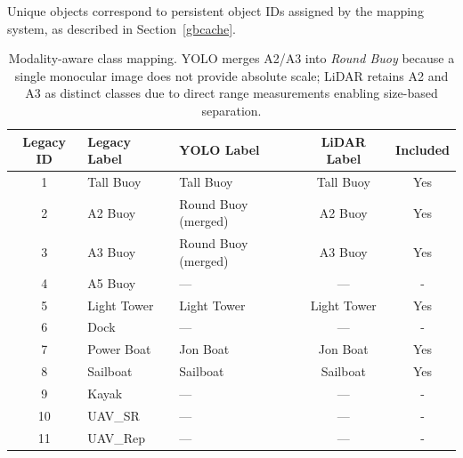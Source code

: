 \documentclass[../main.tex]{subfiles}
\begin{document}


Unique objects correspond to persistent object IDs assigned by the mapping system, as described in Section~\ref{gbcache}.

\begin{table}[ht]
\centering
\begin{tabular}{cllcc}
\hline
Legacy ID & Legacy Label & YOLO Label & LiDAR Label  & Included \\
\hline
1  & Tall Buoy          & Tall Buoy              & Tall Buoy          & Yes \\
2  & A2 Buoy            & Round Buoy (merged)    & A2 Buoy            & Yes \\
3  & A3 Buoy            & Round Buoy (merged)    & A3 Buoy            & Yes \\
4  & A5  Buoy           & —                      & —                  & - \\
5  & Light Tower        & Light Tower            & Light Tower        & Yes \\
6  & Dock               & —                      & —                  & - \\
7  & Power Boat         & Jon Boat               & Jon Boat           & Yes \\
8  & Sailboat           & Sailboat               & Sailboat           & Yes \\
9  & Kayak              & —                      & —                  & - \\
10 & UAV\_SR    & —                      & —                  & - \\
11 & UAV\_Rep   & —                      & —                  & - \\
\hline
\end{tabular}
\caption{Modality-aware class mapping. YOLO merges A2/A3 into \emph{Round Buoy} because a single monocular image does not provide absolute scale; LiDAR retains A2 and A3 as distinct classes due to direct range measurements enabling size-based separation.}
\label{tab:class_map}
\end{table}
\end{document}
